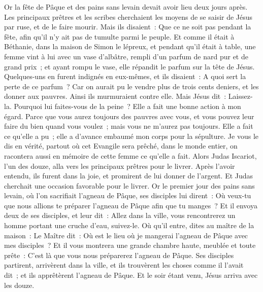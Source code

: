 \begin{multicols}{2}
\VerseOne{}Or la fête de Pâque et des pains sans levain devait avoir lieu deux jours après. Les principaux prêtres et les scribes cherchaient les moyens de se saisir de Jésus par ruse, et de le faire mourir.
Mais ils disaient~: Que ce ne soit pas pendant la fête, afin qu'il n'y ait pas de tumulte parmi le peuple.
Et comme il était à Béthanie, dans la maison de Simon le lépreux, et pendant qu'il était à table, une femme vint à lui avec un vase d'albâtre, rempli d'un parfum de nard pur et de grand prix~; et ayant rompu le vase, elle répandit le parfum sur la tête de Jésus.
Quelques-uns en furent indignés en eux-mêmes, et ils disaient~: A quoi sert la perte de ce parfum~?
Car on aurait pu le vendre plus de trois cents deniers, et les donner aux pauvres. Ainsi ils murmuraient contre elle.
Mais Jésus dit~: Laissez-la. Pourquoi lui faites-vous de la peine~? Elle a fait une bonne action à mon égard.
Parce que vous aurez toujours des pauvres avec vous, et vous pouvez leur faire du bien quand vous voulez~; mais vous ne m'aurez pas toujours.
Elle a fait ce qu'elle a pu~; elle a d'avance embaumé mon corps pour la sépulture.
Je vous le dis en vérité, partout où cet Evangile sera prêché, dans le monde entier, on racontera aussi en mémoire de cette femme ce qu'elle a fait.
Alors Judas Iscariot, l'un des douze, alla vers les principaux prêtres pour le livrer.
Après l'avoir entendu, ils furent dans la joie, et promirent de lui donner de l'argent. Et Judas cherchait une occasion favorable pour le livrer.
Or le premier jour des pains sans levain, où l'on sacrifiait l'agneau de Pâque, ses disciples lui dirent~: Où veux-tu que nous allions te préparer l'agneau de Pâque afin que tu manges~?
Et il envoya deux de ses disciples, et leur dit~: Allez dans la ville, vous rencontrerez un homme portant une cruche d'eau, suivez-le.
Où qu'il entre, dites au maître de la maison~: Le Maître dit~: Où est le lieu où je mangerai l'agneau de Pâque avec mes disciples~?
Et il vous montrera une grande chambre haute, meublée et toute prête~: C'est là que vous nous préparerez l'agneau de Pâque.
Ses disciples partirent, arrivèrent dans la ville, et ils trouvèrent les choses comme il l'avait dit~; et ils apprêtèrent l'agneau de Pâque.
Et le soir étant venu, Jésus arriva avec les douze.

\end{multicols}
